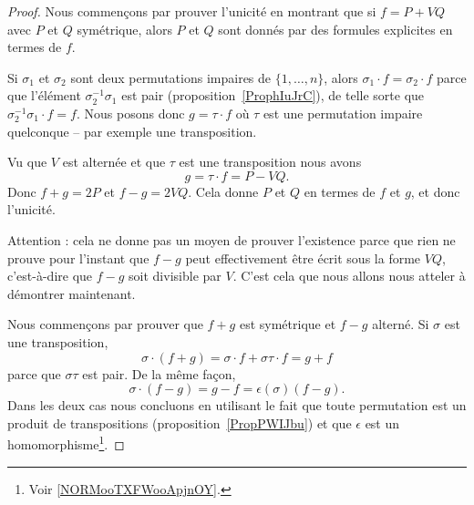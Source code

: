 \begin{proof}

	Nous commençons par prouver l'unicité en montrant que si \( f=P+VQ\) avec \( P\) et \( Q\) symétrique, alors \( P\) et \( Q\) sont donnés par des formules explicites en termes de \( f\).


	Si \( \sigma_1\) et \( \sigma_2\) sont deux permutations impaires de \( \{ 1,\ldots, n \}\), alors \( \sigma_1\cdot f=\sigma_2\cdot f\) parce que l'élément \( \sigma_2^{-1}\sigma_1\) est pair (proposition~\ref{ProphIuJrC}), de telle sorte que \( \sigma_2^{-1}\sigma_1\cdot f=f\). Nous posons donc \( g=\tau\cdot f\) où \( \tau\) est une permutation impaire quelconque -- par exemple une transposition.

	Vu que \( V\) est alternée et que \( \tau\) est une transposition nous avons
	\begin{equation}
		g=\tau\cdot f=P-VQ.
	\end{equation}
	Donc \( f+g=2P\) et \( f-g=2VQ\). Cela donne \( P\) et \( Q\) en termes de \( f\) et \( g\), et donc l'unicité.

	Attention : cela ne donne pas un moyen de prouver l'existence parce que rien ne prouve pour l'instant que \( f-g\) peut effectivement être écrit sous la forme \( VQ\), c'est-à-dire que \( f-g\) soit divisible par \( V\). C'est cela que nous allons nous atteler à démontrer maintenant.

	Nous commençons par prouver que \( f+g\) est symétrique et \( f-g\) alterné. Si \( \sigma\) est une transposition,
	\begin{equation}
		\sigma\cdot(f+g)=\sigma\cdot f+\sigma\tau\cdot f=g+f
	\end{equation}
	parce que \( \sigma\tau\) est pair. De la même façon,
	\begin{equation}
		\sigma\cdot(f-g)=g-f=\epsilon(\sigma)(f-g).
	\end{equation}
	Dans les deux cas nous concluons en utilisant le fait que toute permutation est un produit de transpositions (proposition~\ref{PropPWIJbu}) et que \( \epsilon\) est un homomorphisme\footnote{Voir \ref{NORMooTXFWooApjnOY}.}.


\end{proof}
